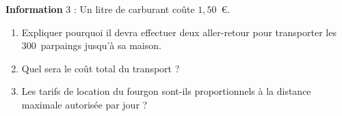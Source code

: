 \bigskip

\textbf{Information} 3 : Un litre de carburant coûte $1,50$~\euro.
 
\medskip
 
\begin{enumerate}
\item Expliquer pourquoi il devra effectuer deux aller-retour pour transporter les $300$~parpaings jusqu'à sa maison. 
\item Quel sera le coût total du transport ? 
\item Les tarifs de location du fourgon sont-ils proportionnels à la distance maximale autorisée par jour ? 
\end{enumerate}

\bigskip

